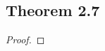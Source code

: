 \documentclass[../../main.tex]{subfiles}
\begin{document}
\subsection{Theorem 2.7}
\begin{wts}

\end{wts}
\begin{proof}

\end{proof}
\end{document}
